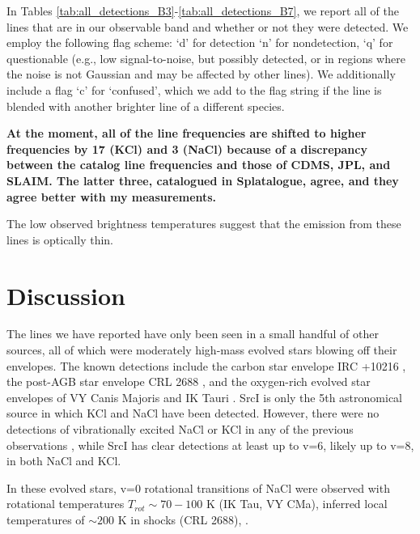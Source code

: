 \documentclass[twocolumn]{aastex62}
\newcommand{\sourcei}{SrcI\xspace}
\begin{document}
In Tables \ref{tab:all_detections_B3}-\ref{tab:all_detections_B7}, we report
all of the lines that are in our observable band and whether or not they were
detected.  We employ the following
flag scheme:
`d' for detection `n' for nondetection, `q' for questionable (e.g., low
signal-to-noise, but possibly detected, or in regions where the noise is
not Gaussian and may be affected by other lines).
We additionally include a flag `c' for `confused', which we add to the flag
string if the line is blended with another brighter line of a different species.

\textbf{\color{red} At the moment, all of the line frequencies are shifted
to higher frequencies by 17 \kms (KCl) and 3 \kms (NaCl) because of a discrepancy
between the \citep{Barton2014a} catalog line frequencies and those of CDMS,
JPL, and SLAIM.  The latter three, catalogued in Splatalogue, agree, and they
agree better with my measurements.}





The low observed brightness temperatures suggest that the emission from
these lines is optically thin.




\section{Discussion}
The lines we have reported have only been seen in a small handful of other sources,
all of which were moderately high-mass evolved stars blowing off their envelopes.
The known detections include the carbon star envelope IRC +10216 \citep{Cernicharo1987a},
the post-AGB star envelope CRL 2688 \citep{Highberger2003a}, and the oxygen-rich
evolved star envelopes of VY Canis Majoris and IK Tauri \citep{Milam2007a}.
\sourcei is only the 5th astronomical source in which KCl and NaCl have been
detected.
However, there were no detections of vibrationally excited NaCl or KCl in any
of the previous observations \citep[][presented the most systematic study of salt
lines, which only included detections of v=0 rotational transitions]{Agundez2012a},
while \sourcei has clear detections at least up to v=6, likely up to v=8, in both
NaCl and KCl.

In these evolved stars, v=0 rotational transitions of NaCl were observed
with rotational temperatures $T_{rot}\sim70-100$ K (IK Tau, VY CMa), inferred
local temperatures of $\sim200$ K in shocks (CRL 2688), .
\end{document}
